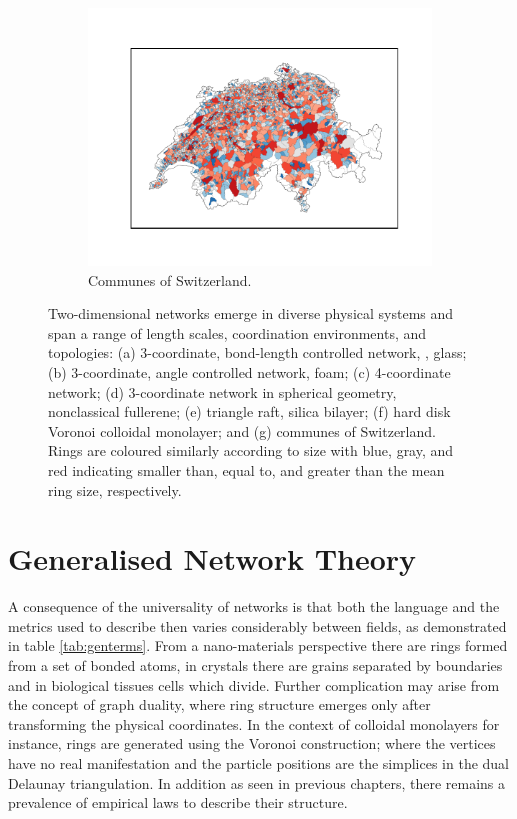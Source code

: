 \begin{figure}[bt]
     \vspace{0.2cm}
     \begin{subfigure}[b]{0.5\textwidth}
         \centering
         \includegraphics[width=\textwidth]{./figures/general_networks/ch.pdf}
         \caption{Communes of Switzerland.}
         \label{fig:ne7}
     \end{subfigure}

     \caption{Two-dimensional networks emerge in diverse physical systems and span a range of length scales, coordination environments,
and topologies: (a) 3-coordinate, bond\--length controlled network, \eg, glass; (b) 3\--coordinate, angle controlled network, \eg{} foam; (c) 4\--coordinate network; (d) 3\--coordinate network in spherical geometry, \eg{} nonclassical fullerene; (e) triangle raft, \eg{} silica bilayer; (f) hard disk Voronoi \eg{} colloidal monolayer; and (g) communes of Switzerland. Rings are coloured similarly according to size with blue, gray, and red indicating smaller than, equal to, and greater than the mean ring size, respectively.}
     \label{fig:networkexamples}
\end{figure}

\section{Generalised Network Theory}

A consequence of the universality of \td{} networks is that both the language and the metrics used to describe then varies considerably between fields, as demonstrated in table \ref{tab:genterms}.
From a nano\--materials perspective there are rings formed from a set of bonded atoms, in crystals there are grains separated by boundaries and in biological tissues cells which divide.
Further complication may arise from the concept of graph duality, where ring structure emerges only after transforming the physical coordinates.
In the context of colloidal monolayers for instance, rings are generated using the Voronoi construction; where the vertices have no real manifestation and the particle positions are the simplices in the dual Delaunay triangulation.
In addition as seen in previous chapters, there remains a prevalence of empirical laws to describe their structure.


